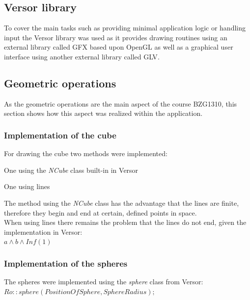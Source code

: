 \documentclass[pdftex,12pt,a4paper]{article}
\begin{document}
\subsection{Versor library}

To cover the main tasks such as providing minimal application logic or handling input the Versor library was used as it provides drawing routines using an external library called \gls{GFX} based upon \gls{OpenGL} as well as a graphical user interface using another external library called \gls{GLV}.
\newpage

\subsection{Geometric operations}

As the geometric operations are the main aspect of the course BZG1310, this section shows how this aspect was realized within the application.\\

\subsubsection{Implementation of the cube}
For drawing the cube two methods were implemented:
\begin{compactitem}
	\item One using the \textit{NCube} class built-in in Versor
	\item One using lines
\end{compactitem}
\vspace*{2mm}
\noindent\hspace*{0mm}The method using the \textit{NCube} class has the advantage that the lines are finite, therefore they begin and end at certain, defined points in space.\\
When using lines there remains the problem that the lines do not end, given the implementation in Versor:\vspace*{5mm}\\
\noindent\hspace*{10mm}\vspace*{5mm} $ a \wedge b \wedge Inf(1) $

\subsubsection{Implementation of the spheres}
The spheres were implemented using the \textit{sphere} class from Versor:\vspace*{5mm}\\
\noindent\hspace*{10mm}\vspace*{5mm} $ Ro::sphere(PositionOfSphere, SphereRadius); $
\end{document}

